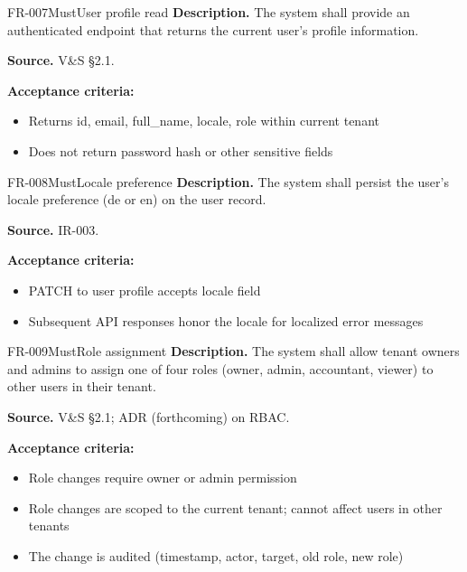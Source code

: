 \documentclass[11pt,a4paper]{article}
\begin{document}
\begin{requirement}{FR-007}{Must}{User profile read}
\textbf{Description.} The system shall provide an authenticated endpoint that returns the current user's profile information.

\textbf{Source.} V\&S \S2.1.

\textbf{Acceptance criteria:}
\begin{itemize}
    \item Returns id, email, full\_name, locale, role within current tenant
    \item Does not return password hash or other sensitive fields
\end{itemize}
\end{requirement}

\begin{requirement}{FR-008}{Must}{Locale preference}
\textbf{Description.} The system shall persist the user's locale preference (de or en) on the user record.

\textbf{Source.} IR-003.

\textbf{Acceptance criteria:}
\begin{itemize}
    \item PATCH to user profile accepts locale field
    \item Subsequent API responses honor the locale for localized error messages
\end{itemize}
\end{requirement}

\begin{requirement}{FR-009}{Must}{Role assignment}
\textbf{Description.} The system shall allow tenant owners and admins to assign one of four roles (owner, admin, accountant, viewer) to other users in their tenant.

\textbf{Source.} V\&S \S2.1; ADR (forthcoming) on RBAC.

\textbf{Acceptance criteria:}
\begin{itemize}
    \item Role changes require owner or admin permission
    \item Role changes are scoped to the current tenant; cannot affect users in other tenants
    \item The change is audited (timestamp, actor, target, old role, new role)
\end{itemize}
\end{requirement}
\end{document}
